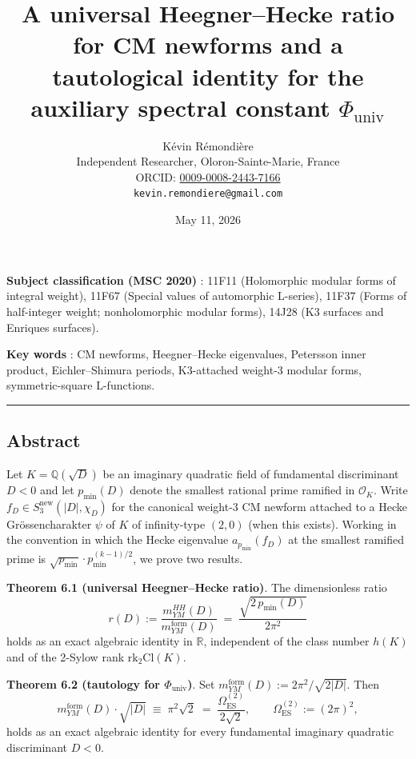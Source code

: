 \documentclass[
  11pt,
  a4paper,
]{amsart}
\title{A universal Heegner--Hecke ratio for CM newforms and a tautological identity for the auxiliary spectral constant $\Phi_{\mathrm{univ}}$}
\author{K\'evin R\'emondi\`ere\\
\small Independent Researcher, Oloron-Sainte-Marie, France\\
\small ORCID: \href{https://orcid.org/0009-0008-2443-7166}{0009-0008-2443-7166}\\
\small \texttt{kevin.remondiere@gmail.com}}
\date{May 11, 2026}
\begin{document}
\maketitle

\textbf{Subject classification (MSC 2020)} : 11F11 (Holomorphic modular forms of integral weight), 11F67 (Special values of automorphic L-series), 11F37 (Forms of half-integer weight; nonholomorphic modular forms), 14J28 (K3 surfaces and Enriques surfaces).

\textbf{Key words} : CM newforms, Heegner--Hecke eigenvalues, Petersson inner product, Eichler--Shimura periods, K3-attached weight-3 modular forms, symmetric-square L-functions.

\begin{center}\rule{0.5\linewidth}{0.5pt}\end{center}

\hypertarget{abstract}{%
\subsection{Abstract}\label{abstract}}

Let \(K = \mathbb{Q}(\sqrt{D})\) be an imaginary quadratic field of fundamental discriminant \(D < 0\) and let \(p_{\min}(D)\) denote the smallest rational prime ramified in \(\mathcal{O}_K\). Write \(f_D \in S_3^{\mathrm{new}}(|D|, \chi_D)\) for the canonical weight-3 CM newform attached to a Hecke Grössencharakter \(\psi\) of \(K\) of infinity-type \((2,0)\) (when this exists). Working in the convention in which the Hecke eigenvalue \(a_{p_{\min}}(f_D)\) at the smallest ramified prime is \(\sqrt{p_{\min}}\cdot p_{\min}^{(k-1)/2}\), we prove two results.

\textbf{Theorem 6.1 (universal Heegner--Hecke ratio)}. The dimensionless ratio
\[
r(D) := \frac{m_{YM}^{HH}(D)}{m_{YM}^{\mathrm{form}}(D)} \;=\; \frac{\sqrt{2\,p_{\min}(D)}}{2\pi^{2}}
\]
holds as an exact algebraic identity in \(\mathbb{R}\), independent of the class number \(h(K)\) and of the 2-Sylow rank \(\mathrm{rk}_2\mathrm{Cl}(K)\).

\textbf{Theorem 6.2 (tautology for \(\Phi_{\mathrm{univ}}\))}. Set \(m_{YM}^{\mathrm{form}}(D) := 2\pi^{2}/\sqrt{2|D|}\). Then
\[
m_{YM}^{\mathrm{form}}(D)\cdot \sqrt{|D|} \;\equiv\; \pi^{2}\sqrt{2} \;=\; \frac{\Omega_{\mathrm{ES}}^{(2)}}{2\sqrt{2}},\qquad \Omega_{\mathrm{ES}}^{(2)} := (2\pi)^{2},
\]
holds as an exact algebraic identity for every fundamental imaginary quadratic discriminant \(D < 0\).
\end{document}
